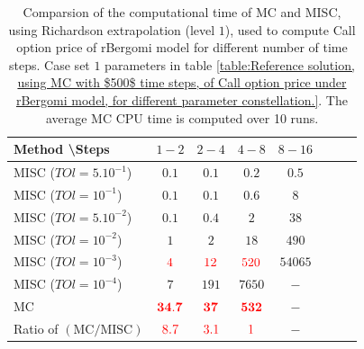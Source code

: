 \documentclass[11pt]{article}
\begin{document}
\begin{table}[!h]
	\centering
	\begin{tabular}{l*{6}{c}r}
		Method \textbackslash  Steps            & $1-2$ & $2-4$ & $4-8$ & $8-16$ &   \\
		\hline
		MISC ($TOl=5.10^{-1}$)  & $0.1$ & $0.1$ & $0.2$ & $0.5$  \\
		MISC ($TOl=10^{-1}$)  & $0.1$ & $0.1$ & $0.6$ & $8$  \\
		MISC ($TOl=5.10^{-2}$)  & $0.1$ & $0.4$ & $2$ & $38$  \\
		MISC ($TOl=10^{-2}$)  & $1$ & $2$ & $18$ & $490$  \\
		MISC ($TOl=10^{-3}$)  & ${\color{red}4}$ & ${\color{red}12}$ & ${\color{red}520}$ & $54065$  \\	
		MISC ($TOl=10^{-4}$)  & $7$ & $191$ & $7650$ & $-$  \\
		\hline
			MC   & $\mathbf{{\color{red} 34.7}}$  & $\mathbf{{\color{red}37}}$  & $\mathbf{ {\color{red}532}}$ &$\mathbf{-}$   \\
		\hline
			Ratio of $\left(\text{MC}/ \text{MISC} \right)$  &${\color{red}8.7}$ & ${\color{red}   3.1
		}$  & ${\color{red}1}$ &  $-$ \\
		\hline
	\end{tabular}
	\caption{Comparsion of the computational time of  MC and MISC, using Richardson extrapolation (level $1$), used to compute Call option price of rBergomi model for different number of time steps. Case set $1$ parameters in table \ref{table:Reference solution, using MC with $500$ time steps, of Call option price under rBergomi model, for different parameter constellation.}. The
average MC CPU time is computed over 10 runs.}
	\label{Comparsion of the computational time of  MC and MISC, using Richardson extrapolation (level $1$), used to compute Call option price of rBergomi model for different number of time steps. Case set $1$ parameters}
\end{table}
\end{document}
